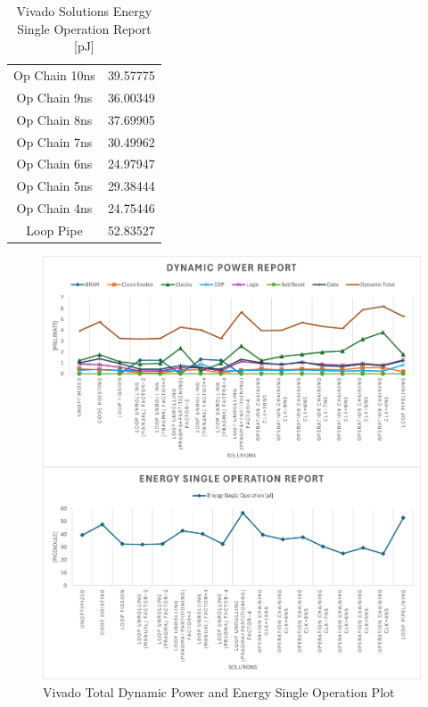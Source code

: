 \begin{table}[H]
\begin{minipage}[t]{0.45\linewidth}
\begin{tabular}{|c|c|}
			Op Chain 10ns & 39.57775 \\
			Op Chain 9ns & 36.00349 \\
			Op Chain 8ns & 37.69905 \\
			Op Chain 7ns & 30.49962 \\
			Op Chain 6ns & 24.97947 \\
			Op Chain 5ns & 29.38444 \\
			Op Chain 4ns & 24.75446 \\
			Loop Pipe & 52.83527 \\
			\hline
		\end{tabular}
		\caption{Vivado Solutions Energy Single Operation Report [pJ]}
		\label{tab:vivado-solutions-energy-single-operation-report}
	\end{minipage}
\end{table}


\begin{figure}[H]
	\centering
	\includegraphics[width=0.7\textheight]{conclusions/powerreport.png}
	\caption{Vivado Total Dynamic Power and Energy Single Operation Plot}
	\label{fig:vivado-solutions-power-plot}
\end{figure}



